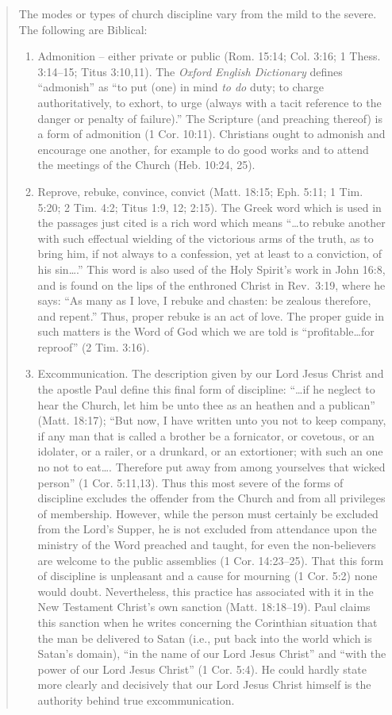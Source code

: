\documentclass[
]{book}
\providecommand{\tightlist}{%
  \setlength{\itemsep}{0pt}\setlength{\parskip}{0pt}}
\begin{document}
\begin{quote}
The modes or types of church discipline vary from the mild to the severe. The following are Biblical:

\begin{enumerate}
\def\labelenumi{\alph{enumi}.}
\tightlist
\item
  Admonition -- either private or public (Rom. 15:14; Col. 3:16; 1 Thess. 3:14--15; Titus 3:10,11). The \emph{Oxford English Dictionary} defines ``admonish'' as ``to put (one) in mind \emph{to do} duty; to charge authoritatively, to exhort, to urge (always with a tacit reference to the danger or penalty of failure).'' The Scripture (and preaching thereof) is a form of admonition (1 Cor. 10:11). Christians ought to admonish and encourage one another, for example to do good works and to attend the meetings of the Church (Heb. 10:24, 25).
\item
  Reprove, rebuke, convince, convict (Matt. 18:15; Eph. 5:11; 1 Tim. 5:20; 2 Tim. 4:2; Titus 1:9, 12; 2:15). The Greek word which is used in the passages just cited is a rich word which means ``\ldots to rebuke another with such effectual wielding of the victorious arms of the truth, as to bring him, if not always to a confession, yet at least to a conviction, of his sin\ldots.'' This word is also used of the Holy Spirit's work in John 16:8, and is found on the lips of the enthroned Christ in Rev.~3:19, where he says: ``As many as I love, I rebuke and chasten: be zealous therefore, and repent.'' Thus, proper rebuke is an act of love. The proper guide in such matters is the Word of God which we are told is ``profitable\ldots for reproof'' (2 Tim. 3:16).
\item
  Excommunication. The description given by our Lord Jesus Christ and the apostle Paul define this final form of discipline: ``\ldots if he neglect to hear the Church, let him be unto thee as an heathen and a publican'' (Matt. 18:17); ``But now, I have written unto you not to keep company, if any man that is called a brother be a fornicator, or covetous, or an idolater, or a railer, or a drunkard, or an extortioner; with such an one no not to eat\ldots. Therefore put away from among yourselves that wicked person'' (1 Cor. 5:11,13). Thus this most severe of the forms of discipline excludes the offender from the Church and from all privileges of membership. However, while the person must certainly be excluded from the Lord's Supper, he is not excluded from attendance upon the ministry of the Word preached and taught, for even the non-believers are welcome to the public assemblies (1 Cor. 14:23--25). That this form of discipline is unpleasant and a cause for mourning (1 Cor. 5:2) none would doubt. Nevertheless, this practice has associated with it in the New Testament Christ's own sanction (Matt. 18:18--19). Paul claims this sanction when he writes concerning the Corinthian situation that the man be delivered to Satan (i.e., put back into the world which is Satan's domain), ``in the name of our Lord Jesus Christ'' and ``with the power of our Lord Jesus Christ'' (1 Cor. 5:4). He could hardly state more clearly and decisively that our Lord Jesus Christ himself is the authority behind true excommunication.

\end{enumerate}
\end{quote}
\end{document}
